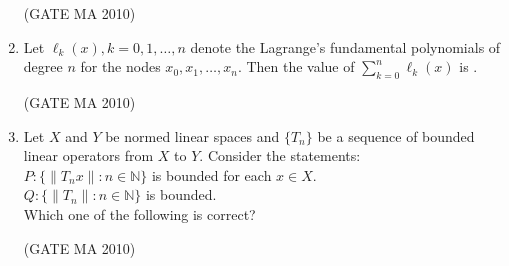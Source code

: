 \documentclass[journal,12pt,onecolumn]{IEEEtran}
\theoremstyle{remark}
\begin{document}
\begin{flushleft}
\begin{enumerate}
\hfill(GATE MA 2010)

\begin{enumerate}
\end{enumerate}

\item Let $\ell_k(x), k=0,1,\dots,n$ denote the Lagrange's fundamental polynomials of degree $n$ for the nodes $x_0,x_1,\dots,x_n$.  
Then the value of $\sum_{k=0}^n \ell_k(x)$ is \underline{\hspace{2cm}}.  

\hfill(GATE MA 2010)

\begin{enumerate}
\end{enumerate}
\item Let $X$ and $Y$ be normed linear spaces and $\{T_n\}$ be a sequence of bounded linear operators from $X$ to $Y$. Consider the statements: \\
$P\colon \{\lVert T_n x\rVert \colon n\in\mathbb{N}\}$ is bounded for each $x\in X$. \\
$Q\colon \{\lVert T_n\rVert \colon n\in\mathbb{N}\}$ is bounded. \\
Which one of the following is correct? \underline{\hspace{2cm}}

\hfill(GATE MA 2010)

\begin{enumerate}
\end{enumerate}


\end{enumerate}
\end{flushleft}
\end{document}
